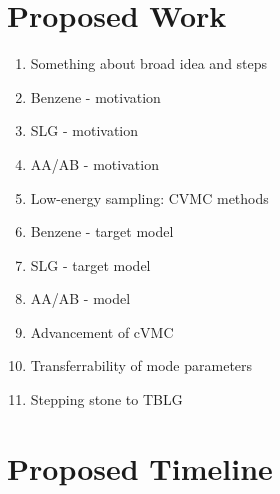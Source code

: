 \documentclass{article}
\begin{document}
\section{Proposed Work}
\begin{enumerate}
\item Something about broad idea and steps

\item Benzene - motivation

\item SLG - motivation

\item AA/AB - motivation 

\item Low-energy sampling: CVMC methods 

\item Benzene - target model  

\item SLG - target model 

\item AA/AB - model 

\item Advancement of cVMC

\item Transferrability of mode parameters

\item Stepping stone to TBLG
\end{enumerate}


\section{Proposed Timeline}
\end{document}
